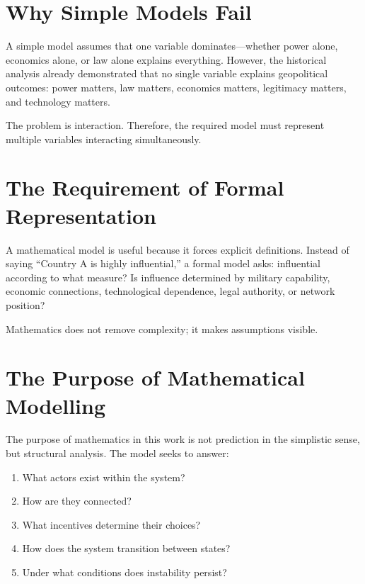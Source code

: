 \documentclass[11pt,openany]{book}
\theoremstyle{plain}
\theoremstyle{definition}
\begin{document}
\section*{Why Simple Models Fail}

A simple model assumes that one variable dominates—whether power alone, economics alone, or law alone explains everything. However, the historical analysis already demonstrated that no single variable explains geopolitical outcomes: power matters, law matters, economics matters, legitimacy matters, and technology matters. 

The problem is interaction. Therefore, the required model must represent multiple variables interacting simultaneously.

\section*{The Requirement of Formal Representation}

A mathematical model is useful because it forces explicit definitions. Instead of saying ``Country A is highly influential,'' a formal model asks: influential according to what measure? Is influence determined by military capability, economic connections, technological dependence, legal authority, or network position?

Mathematics does not remove complexity; it makes assumptions visible.

\section*{The Purpose of Mathematical Modelling}

The purpose of mathematics in this work is not prediction in the simplistic sense, but structural analysis. The model seeks to answer:

\begin{enumerate}
    \item What actors exist within the system?

    \item How are they connected?

    \item What incentives determine their choices?

    \item How does the system transition between states?

    \item Under what conditions does instability persist?
\end{enumerate}
\end{document}
